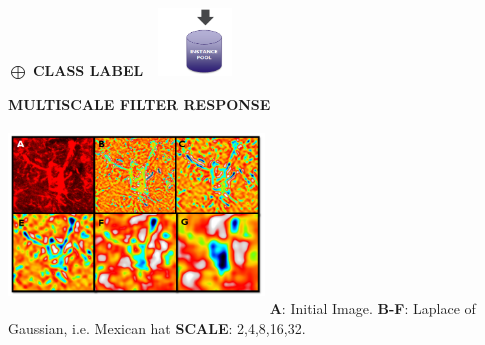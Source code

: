 \documentclass[portrait,final,a0paper]{baposter}
\begin{document}
\begin{poster}
{\begin{minipage}{.18\textwidth}
    \color{primary1} \hspace{1.5cm}\textbf{$\bigoplus$}
	\newline
	\color{Carnelian} \hspace{0.5cm}\textbf{CLASS LABEL}
	\newline
    \color{Carnelian} \hspace{0.3cm}\includegraphics[width=2.5cm, height=1.8cm]{pool}	
\end{minipage}
 \begin{minipage}{.30\textwidth}
 	 \color{primary1} \textbf{MULTISCALE FILTER RESPONSE}
 	    \newline
 		\includegraphics[width=6.8cm, height=5.3cm]{LOGMONTAGE1}
 		\newline
 		\color{secondary2} 
 		\textbf{A}: Initial Image. 
 		\newline
 		\textbf{B-F}: Laplace of Gaussian, i.e. Mexican hat
 		\newline
 		\textbf{SCALE}: 2,4,8,16,32.
 \end{minipage} 
  }


\end{poster}
\end{document}
